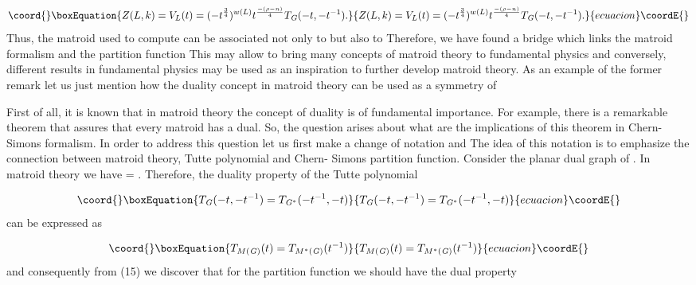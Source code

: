 \documentclass[a4paper,12pt]{article}
\begin{document}
\begin{equation}\coord{}\boxEquation{
Z(L,k)=V_{L}(t)=(-t^{\frac{3}{4}})^{w(L)}t^{\frac{-(\rho -n)}{4}}T_{\mathit{G
}}(-t,-t^{-1}).  \label{15}
}{
Z(L,k)=V_{L}(t)=(-t^{\frac{3}{4}})^{w(L)}t^{\frac{-(\rho -n)}{4}}T_{\mathit{G
}}(-t,-t^{-1}).  }{ecuacion}\coordE{}\end{equation}
Thus, the matroid \coordHE{} used to compute \coordHE{} can be associated not only to \coordHE{} but also to \coordHE{} Therefore, we have found a bridge which links the matroid
formalism \coordHE{} and the partition function \coordHE{} This may
allow to bring many concepts of matroid theory to fundamental physics and
conversely, different results in fundamental physics may be used as an
inspiration to further develop matroid theory. As an example of the former
remark let us just mention how the duality concept in matroid theory can be
used as a symmetry of \coordHE{}

First of all, it is known that in matroid theory the concept of duality is
of fundamental importance. For example, there is a remarkable theorem that
assures that every matroid has a dual. So, the question arises about what
are the implications of this theorem in Chern-Simons formalism. In order to
address this question let us first make a change of notation \coordHE{} and \coordHE{} The idea of this notation is to emphasize the connection
between matroid theory, Tutte polynomial and Chern- Simons partition
function. Consider the planar dual graph \coordHE{} of \coordHE{}%
. In matroid theory we have \coordHE{} =\coordHE{}%
. Therefore, the duality property of the Tutte polynomial

\begin{equation}\coord{}\boxEquation{
T_{\mathit{G}}(-t,-t^{-1})=T_{\mathit{G}^{\ast }}(-t^{-1},-t)  \label{16}
}{
T_{\mathit{G}}(-t,-t^{-1})=T_{\mathit{G}^{\ast }}(-t^{-1},-t)  }{ecuacion}\coordE{}\end{equation}
can be expressed as

\begin{equation}\coord{}\boxEquation{
T_{M(\mathit{G)}}(t)=T_{M^{\ast }(\mathit{G)}}(t^{-1})  \label{17}
}{
T_{M(\mathit{G)}}(t)=T_{M^{\ast }(\mathit{G)}}(t^{-1})  }{ecuacion}\coordE{}\end{equation}
and consequently from (15) we discover that for the partition function \coordHE{} we should have the dual property
\end{document}
